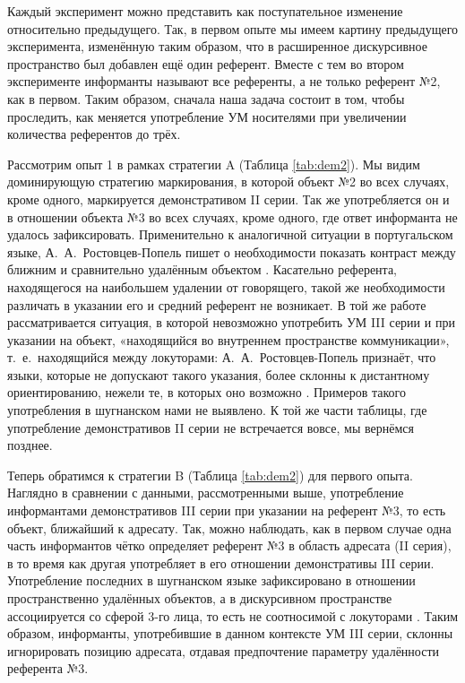 Каждый эксперимент можно представить как поступательное изменение относительно предыдущего. Так, в первом опыте мы имеем картину предыдущего эксперимента, изменённую таким образом, что в расширенное дискурсивное пространство был добавлен ещё один референт. Вместе с тем во втором эксперименте информанты называют все референты, а не только референт №2, как в первом. Таким образом, сначала наша задача состоит в том, чтобы проследить, как меняется употребление УМ носителями при увеличении количества референтов до трёх.

Рассмотрим опыт 1 в рамках стратегии A (Таблица \ref{tab:dem2}). Мы видим доминирующую стратегию маркирования, в которой объект №2 во всех случаях, кроме одного, маркируется демонстративом II серии. Так же употребляется он и в отношении объекта №3 во всех случаях, кроме одного, где ответ информанта не удалось зафиксировать. Применительно к аналогичной ситуации в португальском языке, А.~А.~Ростовцев-Попель пишет о необходимости показать контраст между ближним и сравнительно удалённым объектом \parencite[27]{popiel2009}. Касательно референта, находящегося на наибольшем удалении от говорящего, такой же необходимости различать в указании его и средний референт не возникает. В той же работе рассматривается ситуация, в которой невозможно употребить УМ III серии и при указании на объект, «находящийся во внутреннем пространстве коммуникации», т.~е.~находящийся между локуторами: А.~А.~Ростовцев-Попель признаёт, что языки, которые не допускают такого указания, более склонны к дистантному ориентированию, нежели те, в которых оно возможно \parencite[27]{popiel2009}. Примеров такого употребления в шугнанском нами не выявлено. К той же части таблицы, где употребление демонстративов II серии не встречается вовсе, мы вернёмся позднее.

Теперь обратимся к стратегии B (Таблица \ref{tab:dem2}) для первого опыта. Наглядно в сравнении с данными, рассмотренными выше, употребление информантами демонстративов III серии при указании на референт №3, то есть объект, ближайший к адресату. Так, можно наблюдать, как в первом случае одна часть информантов чётко определяет референт №3 в область адресата (II серия), в то время как другая употребляет в его отношении демонстративы III серии. Употребление последних в шугнанском языке зафиксировано в отношении пространственно удалённых объектов, а в дискурсивном пространстве ассоциируется со сферой 3-го лица, то есть не соотносимой с локуторами \parencite[26]{yusufbekov1998}. Таким образом, информанты, употребившие в данном контексте УМ III серии, склонны игнорировать позицию адресата, отдавая предпочтение параметру удалённости референта №3.

